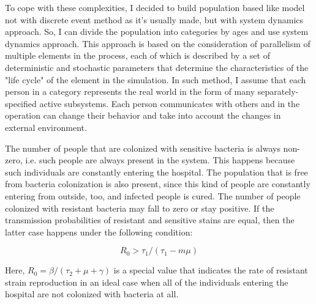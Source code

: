 To cope with these complexities, I decided to build population based like model not with discrete event method as it’s usually made, but with system dynamics approach. So, I can divide the population into categories by ages and use system dynamics approach. This approach is based on the consideration of parallelism of multiple elements in the process, each of which is described by a set of deterministic and stochastic parameters that determine the characteristics of the "life cycle" of the element in the simulation. In such method, I assume that each person in a category represents the real world in the form of many separately-specified active subsystems. Each person communicates with others and in the operation can change their behavior and take into account the changes in external environment.

The number of people that are colonized with sensitive bacteria is always non-zero, i.e. such people are always present in the system. This happens because such individuals are constantly entering the hospital. The population that is free from bacteria colonization is also present, since this kind of people are constantly entering from outside, too, and infected people is cured. The number of people colonized with resistant bacteria may fall to zero or stay positive. If the transmission probabilities of resistant and sensitive stains are equal, then the latter case happens under the following condition:

\begin{equation}
R_0 > \tau_1/(\tau_1 - m \mu)
\end{equation}

Here, $R_0 = \beta/(\tau_2 + \mu + \gamma)$ is a special value that indicates the rate of resistant strain reproduction in an ideal case when all of the individuals entering the hospital are not colonized with bacteria at all.
